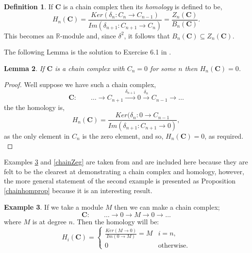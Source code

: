 \documentclass[11.5pt, twoside, a4paper, titlepage]{report}
\providecommand{\equ}[0]{\begin{equation*}}
\providecommand{\eequ}[0] {\end{equation*}}
\theoremstyle{definition}
\newtheorem{mydef}{Definition}[section]
\newtheorem{eg}[mydef]{Example}
\theoremstyle{plain}
\newtheorem{lem}[mydef]{Lemma}
\begin{document}
\begin{mydef}
If $\mathbf{C}$ is a chain complex then its \emph{homology} is defined to be,
\begin{equation*}
H_n(\mathbf{C})=\frac{Ker(\delta_n:C_n \rightarrow C_{n-1})}{Im(\delta_{n+1}:C_{n+1} \rightarrow C_n)} =\frac{Z_n(\mathbf{C})}{B_n(\mathbf{C})}.
\end{equation*}
This becomes an $\mathbb{R}$-module and, since $\delta^2$, it follows that $B_n(\mathbf{C})\subseteq Z_n(\mathbf{C})$.
\end{mydef}

The following Lemma is the solution to Exercise 6.1 in \cite{Rotman}.

\begin{lem}
If $\mathbf{C}$ is a chain complex with $C_n=0$ for some $n$ then $H_n(\mathbf{C})=0$.
\end{lem}
\begin{proof}
Well suppose we have such a chain complex, 
\equ
\mathbf{C}: \qquad \dots \xrightarrow{} C_{n+1} \xrightarrow{\delta_{n+1}} 0 \xrightarrow{\delta_n} C_{n-1} \xrightarrow{} \dots
\eequ
the the homology is,
\equ
H_n(\mathbf{C})=\frac{Ker(\delta_n: 0 \to C_{n-1}}{Im(\delta_{n+1}: C_{n+1}\to 0)},
\eequ
as the only element in $C_n$ is the zero element, and so, $H_n(\mathbf{C})=0$, as required.\\
\end{proof}

Examples \ref{chainMeg} and \ref{chainZeg} are taken from \cite{CB1} and are included here because they are felt to be the clearest at demonstrating a chain complex and homology, however, the more general statement of the second example is presented as Proposition \ref{chainhomprop} because it is an interesting result.

\begin{eg}
 \label{chainMeg}
 If we take a module $M$ then we can make a chain complex;
\begin{equation*}
\mathbf{C}: \qquad \dots \xrightarrow{} 0 \xrightarrow{} M \xrightarrow{} 0 \xrightarrow{} \dots
\end{equation*}
where $M$ is at degree $n$. Then the homology will be:
\begin{equation*}
H_i(\mathbf{C})=\begin{cases}
\frac{Ker(M \rightarrow 0)}{Im(0 \rightarrow M)}=M & i=n,\\
0 & \text{otherwise}.
\end{cases}
\end{equation*}
\end{eg}
\end{document}
